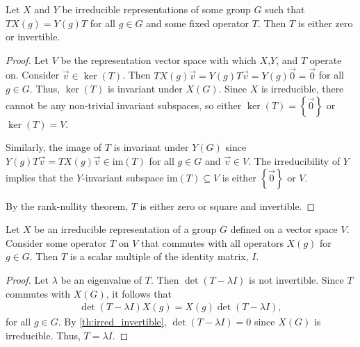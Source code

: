 \begin{lemma}\label{th:irred_invertible}
    Let $X$ and $Y$ be irreducible representations of some group $G$ such that $TX(g)=Y(g)T$ for all $g\in G$ and some fixed operator $T$. Then $T$ is either zero or invertible.
\end{lemma}
\begin{proof}
    Let $V$ be the representation vector space with which $X$,$Y$, and $T$ operate on. Consider $\vec{v}\in\ker(T)$. Then $TX(g)\vec{v} = Y(g)T\vec{v} = Y(g)\vec{0}=\vec{0}$ for all $g\in G$. Thus, $\ker(T)$ is invariant under $X(G)$. Since $X$ is irreducible, there cannot be any non-trivial invariant subspaces, so either $\ker(T) = \left\{ \vec{0} \right\}$ or $\ker(T) = V$.

    Similarly, the image of $T$ is invariant under $Y(G)$ since $Y(g)T\vec{v} = TX(g)\vec{v}\in\textrm{im}(T)$ for all $g\in G$ and $\vec{v}\in V$. The irreducibility of $Y$ implies that the $Y$-invariant subspace $\textrm{im}(T)\subseteq V$ is either $\left\{ \vec{0} \right\}$ or $V$.

    By the rank-nullity theorem, $T$ is either zero or square and invertible.
\end{proof}

\begin{lemma}\label{th:schur}
    Let $X$ be an irreducible representation of a group $G$ defined on a vector space $V$. Consider some operator $T$ on $V$ that commutes with all operators $X(g)$ for $g\in G$. Then $T$ is a scalar multiple of the identity matrix, $I$.
\end{lemma}
\begin{proof}
    Let $\lambda$ be an eigenvalue of $T$. Then $\det(T-\lambda I)$ is not invertible. Since $T$ commutes with $X(G)$, it follows that
    \begin{align*}
        \det(T-\lambda I)X(g)=X(g)\det(T-\lambda I),
    \end{align*}
    for all $g\in G$. By \cref{th:irred_invertible}, $\det(T-\lambda I) = 0$ since $X(G)$ is irreducible. Thus, $T=\lambda I$.
\end{proof}


